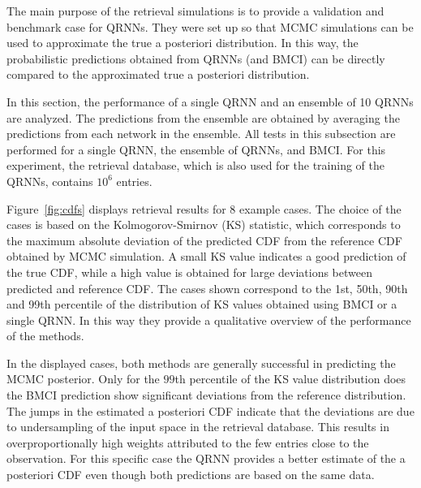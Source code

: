 \documentclass[journal abbreviation, manuscript]{copernicus}
\begin{document}
  The main purpose of the retrieval simulations is to provide a validation
  and benchmark case for QRNNs. They were set up so that MCMC simulations
  can be used to approximate the true a posteriori distribution. In this way,
  the probabilistic predictions obtained from QRNNs (and BMCI) can be directly
  compared to the approximated true a posteriori distribution.

  In this section, the performance of a single QRNN and an ensemble of 10 QRNNs
  are analyzed. The predictions from the ensemble are obtained by averaging the
  predictions from each network in the ensemble. All tests in this subsection are
  performed for a single QRNN, the ensemble of QRNNs, and BMCI. For this
  experiment, the retrieval database, which is also used for the training of the
  QRNNs, contains $10^6$ entries.

    Figure~\ref{fig:cdfs} displays retrieval results for 8 example cases. The
choice of the cases is based on the Kolmogorov-Smirnov (KS) statistic, which
corresponds to the maximum absolute deviation of the predicted CDF from the
reference CDF obtained by MCMC simulation. A small KS value indicates a good
prediction of the true CDF, while a high value is obtained for large deviations
between predicted and reference CDF. The cases shown correspond to the 1st, 50th,
 90th and 99th percentile of the distribution of KS values obtained using BMCI
or a single QRNN. In this way they provide a qualitative overview of the performance
of the methods.

In the displayed cases, both methods are generally successful in predicting the
MCMC posterior. Only for the $99$th percentile of the KS value distribution
does the BMCI prediction show significant deviations from the reference distribution.
 The jumps in the estimated a posteriori CDF indicate that the deviations are due to
undersampling of the input space in the retrieval database. This results in
overproportionally high weights attributed to the few entries close to the
observation. For this specific case the QRNN provides a better estimate of the a
posteriori CDF even though both predictions are based on the same data.
\end{document}
